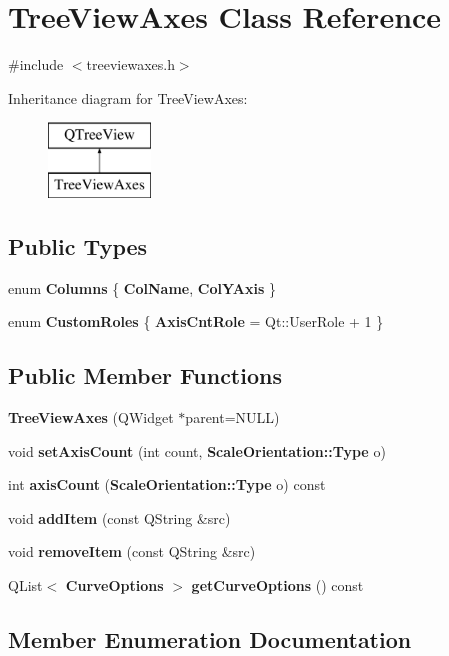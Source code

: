 \section{Tree\+View\+Axes Class Reference}
\label{classTreeViewAxes}


{\ttfamily \#include $<$treeviewaxes.\+h$>$}

Inheritance diagram for Tree\+View\+Axes\+:\begin{figure}[H]
\begin{center}
\leavevmode
\includegraphics[height=2.000000cm]{classTreeViewAxes}
\end{center}
\end{figure}
\subsection*{Public Types}
\begin{DoxyCompactItemize}
\item 
enum {\bf Columns} \{ {\bf Col\+Name}, 
{\bf Col\+Y\+Axis}
 \}
\item 
enum {\bf Custom\+Roles} \{ {\bf Axis\+Cnt\+Role} = Qt\+:\+:User\+Role + 1
 \}
\end{DoxyCompactItemize}
\subsection*{Public Member Functions}
\begin{DoxyCompactItemize}
\item 
{\bf Tree\+View\+Axes} (Q\+Widget $\ast$parent=N\+U\+LL)
\item 
void {\bf set\+Axis\+Count} (int count, {\bf Scale\+Orientation\+::\+Type} o)
\item 
int {\bf axis\+Count} ({\bf Scale\+Orientation\+::\+Type} o) const 
\item 
void {\bf add\+Item} (const Q\+String \&src)
\item 
void {\bf remove\+Item} (const Q\+String \&src)
\item 
Q\+List$<$ {\bf Curve\+Options} $>$ {\bf get\+Curve\+Options} () const 
\end{DoxyCompactItemize}


\subsection{Member Enumeration Documentation}

